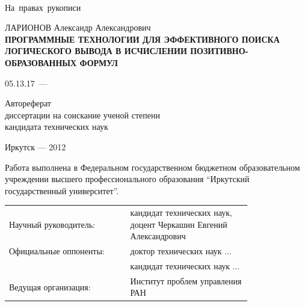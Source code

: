 \documentclass[a4paper]{report}
\begin{document}

\begin{titlepage}
\mbox{~}\\{}
\vfill{}
\hfill{\vbox{\hbox{На правах рукописи}}}
\vspace{1cm}\vfill
\begin{center}
    ЛАРИОНОВ Александр Александрович \\
    \vspace{0.5cm}
\bf ПРОГРАММНЫЕ ТЕХНОЛОГИИ ДЛЯ ЭФФЕКТИВНОГО ПОИСКА ЛОГИЧЕСКОГО ВЫВОДА В ИСЧИСЛЕНИИ ПОЗИТИВНО-ОБРАЗОВАННЫХ ФОРМУЛ
\end{center}
\vfill
\hfil\hbox{\hbox{05.13.17 --- }
    \hbox{}%
}\hfil
\vspace{1cm}
\begin{center}
    Автореферат \\
    диссертации на соискание ученой степени \\
    кандидата технических наук
\end{center}
\vfill
\vfill
\begin{center}
{Иркутск --- 2012}
\end{center}
\end{titlepage}

%
\def\namepc{\hbox{$\rm\mu{}$PrISM}}

\newpage
\setcounter{page}{2}
Работа выполнена в Федеральном государственном бюджетном образовательном учреждении высшего профессионального образования ``Иркутский государственный университет''.


\begin{longtable}[H]{p{0.4\linewidth}p{0.4\linewidth}}
Научный руководитель: & кандидат технических наук, доцент Черкашин Евгений Александрович \\
Официальные  оппоненты: & доктор технических наук ... \\
{}~{}  & кандидат технических наук ... \\
Ведущая организация: & Институт проблем управления РАН \\
\end{longtable}
\end{document}
